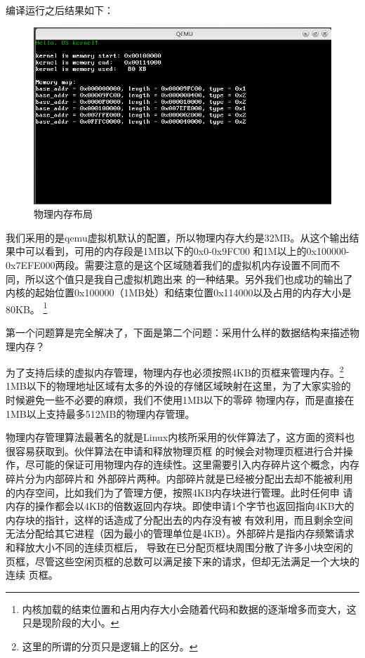 \par 编译运行之后结果如下：

\begin{figure}[ht]
      \centering
      \includegraphics[scale=0.6]{picture/chapt9/PHY_MEM_MAP.png}
      \caption{物理内存布局}
\end{figure}

\par 我们采用的是qemu虚拟机默认的配置，所以物理内存大约是32MB。从这个输出结果中可以看到，可用的内存段是1MB以下的0x0-0x9FC00\allowbreak
和1M以上的0x100000-0x7EFE000两段。需要注意的是这个区域随着我们的虚拟机内存设置不同而不同，所以这个值只是我自己虚拟机跑出来\allowbreak
的一种结果。另外我们也成功的输出了内核的起始位置0x100000（1MB处）和结束位置0x114000以及占用的内存大小是80KB。\allowbreak
\footnote{内核加载的结束位置和占用内存大小会随着代码和数据的逐渐增多而变大，这只是现阶段的大小。}

\par 第一个问题算是完全解决了，下面是第二个问题：采用什么样的数据结构来描述物理内存？

\par 为了支持后续的虚拟内存管理，物理内存也必须按照4KB的页框来管理内存。\footnote{这里的所谓的分页只是逻辑上的区分。}\allowbreak
1MB以下的物理地址区域有太多的外设的存储区域映射在这里，为了大家实验的时候避免一些不必要的麻烦，我们不使用1MB以下的零碎\allowbreak
物理内存，而是直接在1MB以上支持最多512MB的物理内存管理。

\par 物理内存管理算法最著名的就是Linux内核所采用的伙伴算法了，这方面的资料也很容易获取到。伙伴算法在申请和释放物理页框\allowbreak
的时候会对物理页框进行合并操作，尽可能的保证可用物理内存的连续性。这里需要引入内存碎片这个概念，内存碎片分为内部碎片和\allowbreak
外部碎片两种。内部碎片就是已经被分配出去却不能被利用的内存空间，比如我们为了管理方便，按照4KB内存块进行管理。此时任何申\allowbreak
请内存的操作都会以4KB的倍数返回内存块。即使申请1个字节也返回指向4KB大的内存块的指针，这样的话造成了分配出去的内存没有被\allowbreak
有效利用，而且剩余空间无法分配给其它进程（因为最小的管理单位是4KB）。外部碎片是指内存频繁请求和释放大小不同的连续页框后，\allowbreak
导致在已分配页框块周围分散了许多小块空闲的页框，尽管这些空闲页框的总数可以满足接下来的请求，但却无法满足一个大块的连续\allowbreak
页框。

